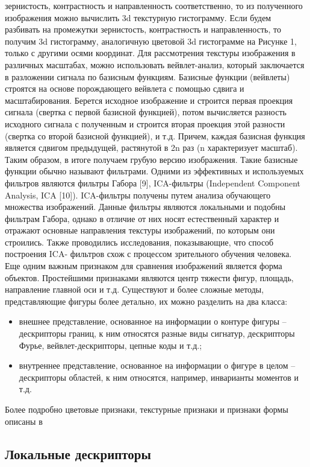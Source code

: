 зернистость, контрастность и направленность соответственно, то из полученного
изображения можно вычислить 3d текстурную гистограмму. Если будем разбивать на
промежутки зернистость, контрастность и направленность, то получим 3d гистограмму,
аналогичную цветовой 3d гистограмме на Рисунке 1, только с другими осями координат.
Для рассмотрения текстуры изображения в различных масштабах, можно
использовать вейвлет-анализ, который заключается в разложении сигнала по базисным
функциям. Базисные функции (вейвлеты) строятся на основе порождающего вейвлета с
помощью сдвига и масштабирования. Берется исходное изображение и строится первая
проекция сигнала (свертка с первой базисной функцией), потом вычисляется разность
исходного сигнала с полученным и строится вторая проекция этой разности (свертка со
второй базисной функцией), и т.д. Причем, каждая базисная функция является сдвигом
предыдущей, растянутой в 2n
раз (n характеризует масштаб). Таким образом, в итоге
получаем грубую версию изображения. Такие базисные функции обычно называют
фильтрами. Одними из эффективных и используемых фильтров являются фильтры Габора
[9], ICA-фильтры (Independent Component Analysis, ICA [10]). ICA-фильтры получены
путем анализа обучающего множества изображений. Данные фильтры являются
локальными и подобны фильтрам Габора, однако в отличие от них носят естественный
характер и отражают основные направления текстуры изображений, по которым они
строились. Также проводились исследования, показывающие, что способ построения ICA-
фильтров схож с процессом зрительного обучения человека.
Еще одним важным признаком для сравнения изображений является форма
объектов. Простейшими признаками являются центр тяжести фигур, площадь,
направление главной оси и т.д. Существуют и более сложные методы, представляющие
фигуры более детально, их можно разделить на два класса:
\begin{itemize}
\item  внешнее представление, основанное на информации о контуре фигуры –
дескрипторы границ, к ним относятся разные виды сигнатур, дескрипторы
Фурье, вейвлет-дескрипторы, цепные коды и т.д.;
\item  внутреннее представление, основанное на информации о фигуре в целом –
дескрипторы областей, к ним относятся, например, инварианты моментов и т.д.
\end{itemize}
Более подробно цветовые признаки, текстурные признаки и признаки формы описаны в
\subsection{Локальные дескрипторы}

